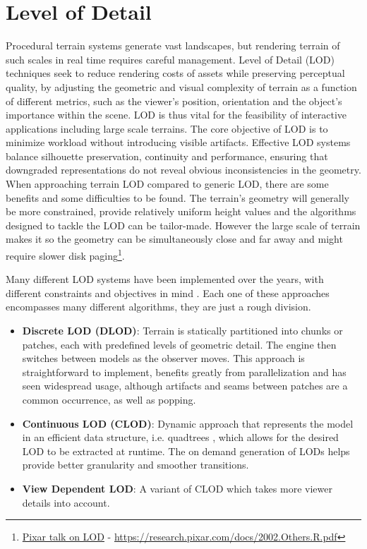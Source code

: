 \section{Level of Detail}
Procedural terrain systems generate vast landscapes, but rendering terrain of such scales in real time requires careful management.
Level of Detail (LOD) techniques seek to reduce rendering costs of assets while preserving perceptual quality, by adjusting the geometric and visual complexity of terrain as a function of different metrics, such as the viewer's position, orientation and the object's importance within the scene.
LOD is thus vital for the feasibility of interactive applications including large scale terrains.
The core objective of LOD is to minimize workload without introducing visible artifacts.
Effective LOD systems balance silhouette preservation, continuity and performance, ensuring that downgraded representations do not reveal obvious inconsistencies in the geometry.
When approaching terrain LOD compared to generic LOD, there are some benefits and some difficulties to be found.
The terrain's geometry will generally be more constrained, provide relatively uniform height values and the algorithms designed to tackle the LOD can be tailor-made. 
However the large scale of terrain makes it so the geometry can be simultaneously close and far away and might require slower disk paging\footnote{\href{https://research.pixar.com/docs/2002.Others.R.pdf}{Pixar talk on LOD} - \url{https://research.pixar.com/docs/2002.Others.R.pdf}}.

Many different LOD systems have been implemented over the years, with different constraints and objectives in mind \cite{Dalei:2022:RLB}.
Each one of these approaches encompasses many different algorithms, they are just a rough division.
\begin{itemize}
    \item \textbf{Discrete LOD (DLOD)}:
    Terrain is statically partitioned into chunks or patches, each with predefined levels of geometric detail.
    The engine then switches between models as the observer moves.
    This approach is straightforward to implement, benefits greatly from parallelization and has seen widespread usage, although artifacts and seams between patches are a common occurrence, as well as popping.
    
    \item \textbf{Continuous LOD (CLOD)}:
    Dynamic approach that represents the model in an efficient data structure, i.e. quadtrees \cite{Suarez:2015:ETL}, which allows for the desired LOD to be extracted at runtime.
    The on demand generation of LODs helps provide better granularity and smoother transitions.
    
    \item \textbf{View Dependent LOD}:
    A variant of CLOD which takes more viewer details into account.
\end{itemize}

